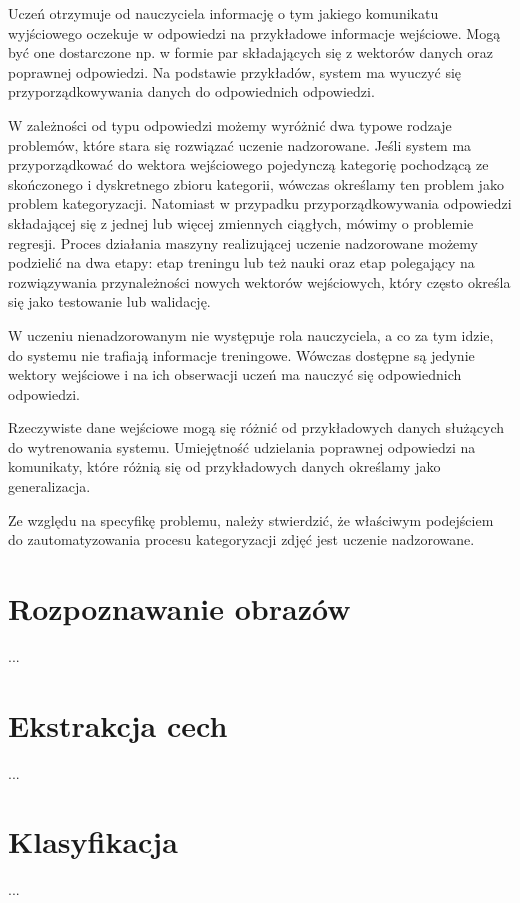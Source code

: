 Uczeń otrzymuje od nauczyciela informację o tym jakiego komunikatu wyjściowego oczekuje w odpowiedzi na przykładowe informacje wejściowe. Mogą być one dostarczone np. w formie par składających się z wektorów danych oraz poprawnej odpowiedzi. Na podstawie przykładów, system ma wyuczyć się przyporządkowywania danych do odpowiednich odpowiedzi.

W zależności od typu odpowiedzi możemy wyróżnić dwa typowe rodzaje problemów, które stara się rozwiązać uczenie nadzorowane. Jeśli system ma przyporządkować do wektora wejściowego pojedynczą kategorię pochodzącą ze skończonego i dyskretnego zbioru kategorii, wówczas określamy ten problem jako problem kategoryzacji. Natomiast w przypadku przyporządkowywania odpowiedzi składającej się z jednej lub więcej zmiennych ciągłych, mówimy o problemie regresji.\cite{BISHOP06} Proces działania maszyny realizującej uczenie nadzorowane możemy podzielić na dwa etapy: etap treningu lub też nauki oraz etap polegający na rozwiązywania przynależności nowych wektorów wejściowych, który często określa się jako testowanie lub walidację.

W uczeniu nienadzorowanym nie występuje rola nauczyciela, a co za tym idzie, do systemu nie trafiają informacje treningowe. Wówczas dostępne są jedynie wektory wejściowe i na ich obserwacji uczeń ma nauczyć się odpowiednich odpowiedzi.\cite{CICHOSZ00} 

Rzeczywiste dane wejściowe mogą się różnić od przykładowych danych służących do wytrenowania systemu. Umiejętność udzielania poprawnej odpowiedzi na komunikaty, które różnią się od przykładowych danych określamy jako generalizacja.\cite{BISHOP06}

Ze względu na specyfikę problemu, należy stwierdzić, że właściwym podejściem do zautomatyzowania procesu kategoryzacji zdjęć jest uczenie nadzorowane.

\section{Rozpoznawanie obrazów}
...

\section{Ekstrakcja cech}
...

\section{Klasyfikacja}
...


